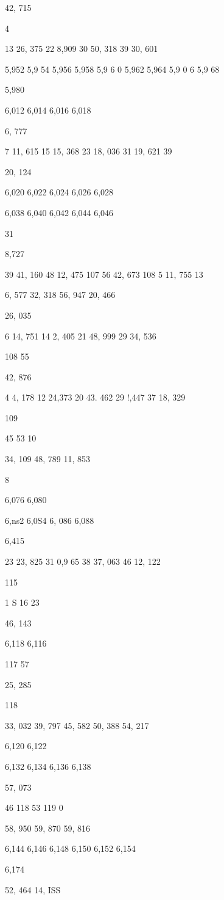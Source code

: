 \documentclass[10pt,a4paper]{article}
\begin{document}
42, 715

4

13 26, 375
22
8,909
30 50, 318
39 30, 601

5,952
5,9 54
5,956
5,958
5,9 6 0
5,962
5,964
5,9 0 6
5,9 68

5,980

6,012
6,014
6,016
6,018

6, 777

7 11, 615
15 15, 368
23 18, 036
31 19, 621
39

20, 124

6,020
6,022
6,024
6,026
6,028

6,038
6,040
6,042
6,044
6,046

31

8,727

39 41, 160
48 12, 475
107 56 42, 673
108 5 11, 755
13

6, 577
32, 318
56, 947
20, 466

26, 035

6 14, 751
14 2, 405
21 48, 999
29 34, 536

108 55

42, 876

4
4, 178
12 24,373
20 43. 462
29
!,447
37 18, 329

109

45
53
10

34, 109
48, 789
11, 853

8

6,076
6,080

6,ns2
6,0S4
6, 086
6,088

6,415

23 23, 825
31
0,9 65
38 37, 063
46 12, 122

115

1
S
16
23

46, 143

6,118
6,116

117 57

25, 285

118

33, 032
39, 797
45, 582
50, 388
54, 217

6,120
6,122

6,132
6,134
6,136
6,138

57, 073

46
118 53
119 0

58, 950
59, 870
59, 816

6,144
6,146
6,148
6,150
6,152
6,154

6,174

52, 464
14, ISS
\end{document}
